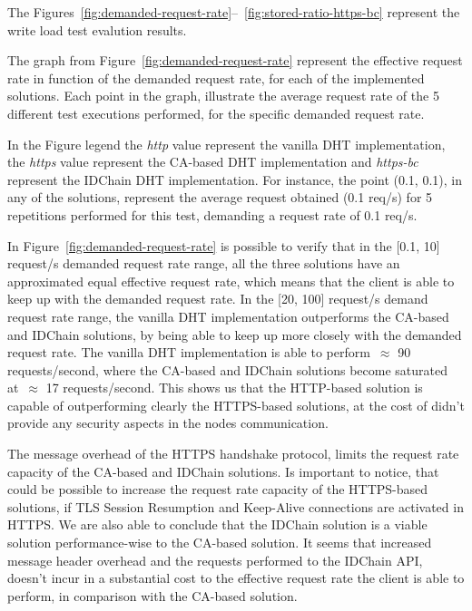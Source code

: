 The Figures~\ref{fig:demanded-request-rate}–~\ref{fig:stored-ratio-https-bc} represent the write load test evalution results.

The graph from Figure~\ref{fig:demanded-request-rate} represent the effective request rate in function of the demanded request rate, for each of the implemented solutions.
Each point in the graph, illustrate the average request rate of the 5 different test executions performed, for the specific demanded request rate.

In the Figure legend the \textit{http} value represent the vanilla DHT implementation, the \textit{https} value represent the CA-based DHT implementation and \textit{https-bc} represent the IDChain DHT implementation.
For instance, the point (0.1, 0.1), in any of the solutions, represent the average request obtained (0.1 req/s) for 5 repetitions performed for this test, demanding a request rate of 0.1 req/s.

In Figure~\ref{fig:demanded-request-rate} is possible to verify that in the [0.1, 10] request/s demanded request rate range, all the three solutions have an approximated equal effective request rate, which means that the client is able to keep up with the demanded request rate.
In the [20, 100] request/s demand request rate range, the vanilla DHT implementation outperforms the CA-based and IDChain solutions, by being able to keep up more closely with the demanded request rate.
The vanilla DHT implementation is able to perform~$\approx$ 90 requests/second, where the CA-based and IDChain solutions become saturated at~$\approx$ 17 requests/second.
This shows us that the HTTP-based solution is capable of outperforming clearly the HTTPS-based solutions, at the cost of didn't provide any security aspects in the nodes communication.

The message overhead of the HTTPS handshake protocol, limits the request rate capacity of the CA-based and IDChain solutions.
Is important to notice, that could be possible to increase the request rate capacity of the HTTPS-based solutions, if TLS Session Resumption and Keep-Alive connections are activated in HTTPS.
We are also able to conclude that the IDChain solution is a viable solution performance-wise to the CA-based solution.
It seems that increased message header overhead and the requests performed to the IDChain API, doesn't incur in a substantial cost to the effective request rate the client is able to perform, in comparison with the CA-based solution.

